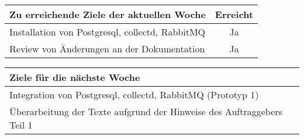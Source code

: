 \begin{tabularx}{\textwidth}{Xc}
    \arrayrulecolor{OliveGreen}
    \toprule
    {\bfseries Zu erreichende Ziele der aktuellen Woche} & {\bfseries Erreicht} \\
    \midrule[2pt]
    Installation von Postgresql, collectd, RabbitMQ      &Ja                    \\
    \rowcolor{OliveGreen!15}
    Review von Änderungen an der Dokumentation           &Ja                    \\
    \bottomrule[2pt]
\end{tabularx}
%
\vspace{1cm}
%
\begin{tabularx}{\textwidth}{Xc}
    \arrayrulecolor{OliveGreen}
    \toprule
    {\bfseries Ziele für die nächste Woche}              &                      \\
    \midrule[2pt]
    Integration von Postgresql, collectd, RabbitMQ (Prototyp 1) &               \\
    \rowcolor{OliveGreen!15}
    Überarbeitung der Texte aufgrund der Hinweise des Auftraggebers Teil 1 &    \\
\end{tabularx}
